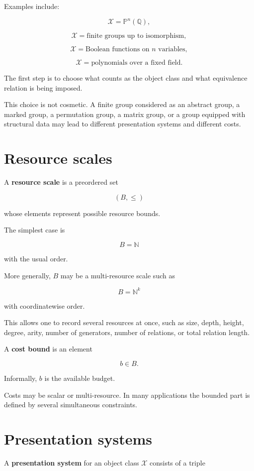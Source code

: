 \documentclass[11pt]{article}
\begin{document}
Examples include:

\[
\mathcal X=\mathbb P^n(\mathbb Q),
\]

\[
\mathcal X={\text{finite groups up to isomorphism}},
\]

\[
\mathcal X={\text{Boolean functions on }n\text{ variables}},
\]

\[
\mathcal X={\text{polynomials over a fixed field}}.
\]

The first step is to choose what counts as the object class and what equivalence relation is being imposed.

This choice is not cosmetic. A finite group considered as an abstract group, a marked group, a permutation group, a matrix group, or a group equipped with structural data may lead to different presentation systems and different costs.


\section{Resource scales}

A \textbf{resource scale} is a preordered set

\[
(B,\leq)
\]

whose elements represent possible resource bounds.

The simplest case is

\[
B=\mathbb N
\]

with the usual order.

More generally, \(B\) may be a multi-resource scale such as

\[
B=\mathbb N^k
\]

with coordinatewise order.

This allows one to record several resources at once, such as size, depth, height, degree, arity, number of generators, number of relations, or total relation length.

A \textbf{cost bound} is an element

\[
b\in B.
\]

Informally, \(b\) is the available budget.

Costs may be scalar or multi-resource. In many applications the bounded part is defined by several simultaneous constraints.


\section{Presentation systems}

A \textbf{presentation system} for an object class \(\mathcal X\) consists of a triple
\end{document}
